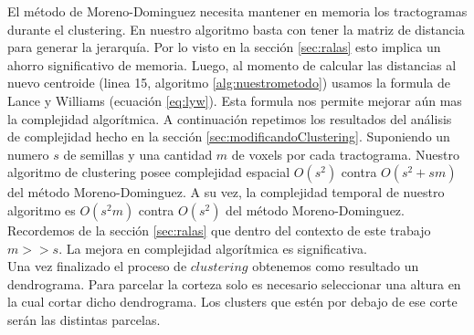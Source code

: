 El m\'etodo de Moreno-Dominguez necesita mantener en memoria los
tractogramas durante el clustering. En nuestro algoritmo basta con tener
la matriz de distancia para generar la jerarqu\'ia. Por lo visto en la
secci\'on \ref{sec:ralas} esto implica un ahorro significativo de memoria.
Luego, al momento de calcular las distancias al nuevo centroide 
(linea 15, algoritmo \ref{alg:nuestrometodo}) usamos la formula de Lance y
Williams (ecuaci\'on \ref{eq:lyw}). Esta formula nos permite mejorar a\'un 
mas la complejidad algor\'itmica. A continuaci\'on repetimos los resultados
del an\'alisis de complejidad hecho en la secci\'on 
\ref{sec:modificandoClustering}. 
Suponiendo un numero $s$ de semillas y una cantidad $m$ de voxels por cada
tractograma. Nuestro algoritmo de clustering posee complejidad espacial 
$O(s^2)$ contra $O(s^2 + sm)$ del m\'etodo Moreno-Dominguez. A su vez, la
complejidad temporal de nuestro algoritmo es $O(s^2m)$ contra $O(s^2)$ del
m\'etodo Moreno-Dominguez. Recordemos de la secci\'on \ref{sec:ralas} que
dentro del contexto de este trabajo $m >> s$. La mejora en complejidad 
algor\'itmica es significativa. \\

Una vez finalizado el proceso de $clustering$ obtenemos como resultado un 
dendrograma. Para parcelar la corteza solo es necesario seleccionar una
altura en la cual cortar dicho dendrograma. Los clusters que est\'en por
debajo de ese corte ser\'an las distintas parcelas. \\
